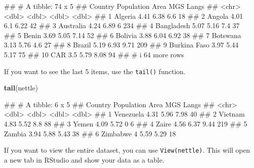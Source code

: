 \documentclass[
]{book}
\newenvironment{Shaded}{\begin{snugshade}}{\end{snugshade}}
\newcommand{\FunctionTok}[1]{\textcolor[rgb]{0.13,0.29,0.53}{\textbf{#1}}}
\newcommand{\NormalTok}[1]{#1}
\begin{document}
\begin{Shaded}
\begin{Highlighting}[]
\NormalTok{\#\# \# A tibble: 74 x 5}
\NormalTok{\#\#    Country      Population  Area   MGS Langs}
\NormalTok{\#\#    \textless{}chr\textgreater{}             \textless{}dbl\textgreater{} \textless{}dbl\textgreater{} \textless{}dbl\textgreater{} \textless{}dbl\textgreater{}}
\NormalTok{\#\#  1 Algeria            4.41  6.38  6.6     18}
\NormalTok{\#\#  2 Angola             4.01  6.1   6.22    42}
\NormalTok{\#\#  3 Australia          4.24  6.89  6      234}
\NormalTok{\#\#  4 Bangladesh         5.07  5.16  7.4     37}
\NormalTok{\#\#  5 Benin              3.69  5.05  7.14    52}
\NormalTok{\#\#  6 Bolivia            3.88  6.04  6.92    38}
\NormalTok{\#\#  7 Botswana           3.13  5.76  4.6     27}
\NormalTok{\#\#  8 Brazil             5.19  6.93  9.71   209}
\NormalTok{\#\#  9 Burkina Faso       3.97  5.44  5.17    75}
\NormalTok{\#\# 10 CAR                3.5   5.79  8.08    94}
\NormalTok{\#\# \# i 64 more rows}
\end{Highlighting}
\end{Shaded}

If you want to see the last 5 items, use the \texttt{tail()} function.

\begin{Shaded}
\begin{Highlighting}[]
\FunctionTok{tail}\NormalTok{(nettle)}
\end{Highlighting}
\end{Shaded}

\begin{Shaded}
\begin{Highlighting}[]
\NormalTok{\#\# \# A tibble: 6 x 5}
\NormalTok{\#\#   Country   Population  Area   MGS Langs}
\NormalTok{\#\#   \textless{}chr\textgreater{}          \textless{}dbl\textgreater{} \textless{}dbl\textgreater{} \textless{}dbl\textgreater{} \textless{}dbl\textgreater{}}
\NormalTok{\#\# 1 Venezuela       4.31  5.96  7.98    40}
\NormalTok{\#\# 2 Vietnam         4.83  5.52  8.8     88}
\NormalTok{\#\# 3 Yemen           4.09  5.72  0        6}
\NormalTok{\#\# 4 Zaire           4.56  6.37  9.44   219}
\NormalTok{\#\# 5 Zambia          3.94  5.88  5.43    38}
\NormalTok{\#\# 6 Zimbabwe        4     5.59  5.29    18}
\end{Highlighting}
\end{Shaded}

If you want to view the entire dataset, you can use \texttt{View(nettle)}. This will open a new tab in RStudio and show your data as a table.
\end{document}
